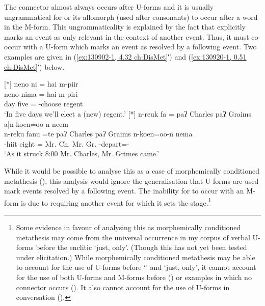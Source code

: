 The connector  almost always occurs after U-forms
and it is usually ungrammatical for  or its allomorph  (used after consonants)
to occur after a word in the M-form.
This ungrammaticality is explained by the fact that 
explicitly marks an event as only relevant in the context of another event.
Thus, it must co-occur with a U-form which
marks an event as resolved by a following event.
Two examples are given in (\ref{ex:130902-1, 4.32 ch:DisMet}′)
and (\ref{ex:130920-1, 0.51 ch:DisMet}′) below.

\begin{exe}
	{\glll
								neno ni = hai m-piir \\
								neno nima = hai m-piri \\
								day five{\tbrM} {=\tbr{\te}} {\hai} \m-choose{\M} regent\\
					\glt	`In five days we'll elect a (new) regent.' }
	{\glll
								n-reuk fa = paʔ Charles paʔ Graims a|n-koen=oo-n neem\\
								n-reku fanu =te paʔ Charles paʔ Graims {\a}n-koen=oo-n nema\\
								\n-hiit eight{\tbrM} {=\tbr{\te}} Mr. Ch. Mr. Gr. \a\n-depart={\oo-\N} {\nema}\\
					\glt	`As it struck 8:00 Mr. Charles, Mr. Grimes came.' }
\end{exe}

While it would be possible to analyse this as a case of
morphemically conditioned metathesis (),
this analysis would ignore the generalisation that
U-forms are used mark events resolved by a following event.
The inability for  to occur with an M-form is due to 
requiring another event for which it sets the stage.\footnote{
		Some evidence in favour of analysing this as morphemically conditioned
		metathesis may come from the universal occurrence in my corpus of verbal U-forms
		before the enclitic  `just, only'.
		(Though this has not yet been tested under elicitation.)
		While morphemically conditioned metathesis may be able
		to account for the use of U-forms before  `{\te}'
		and  `just, only', it cannot account for the use of
		both U-forms and M-forms before  () or
		examples in which no connector occurs ().
		It also cannot account for the use of U-forms in conversation ().}

